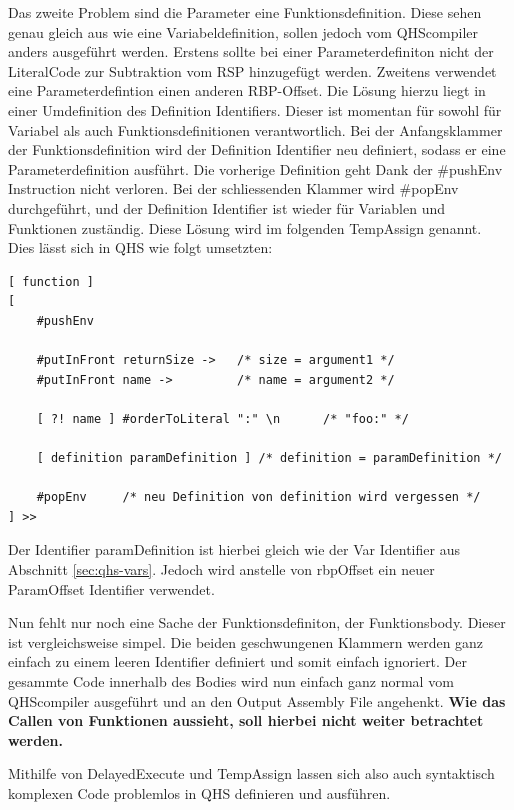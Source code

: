 Das zweite Problem sind die Parameter eine Funktionsdefinition. Diese sehen genau gleich aus wie eine Variabeldefinition, sollen jedoch vom QHScompiler anders ausgeführt werden.
Erstens sollte bei einer Parameterdefiniton nicht der LiteralCode zur Subtraktion vom RSP hinzugefügt werden. Zweitens verwendet eine Parameterdefintion einen anderen RBP-Offset.
Die Lösung hierzu liegt in einer Umdefinition des Definition Identifiers. Dieser ist momentan für sowohl für Variabel als auch Funktionsdefinitionen verantwortlich.
Bei der Anfangsklammer der Funktionsdefinition wird der Definition Identifier neu definiert, sodass er eine Parameterdefinition ausführt. Die vorherige Definition geht Dank der \#pushEnv Instruction nicht verloren.
Bei der schliessenden Klammer wird \#popEnv durchgeführt, und der Definition Identifier ist wieder für Variablen und Funktionen zuständig. Diese Lösung wird im folgenden TempAssign genannt.
Dies lässt sich in QHS wie folgt umsetzten:

\begin{lstlisting}[language=QHS, caption=Implementation eines TempAssigns für Parameter Definitionen]
[ function ]
[
    #pushEnv

    #putInFront returnSize ->   /* size = argument1 */
    #putInFront name ->         /* name = argument2 */

    [ ?! name ] #orderToLiteral ":" \n      /* "foo:" */

    [ definition paramDefinition ] /* definition = paramDefinition */

    #popEnv     /* neu Definition von definition wird vergessen */
] >>
\end{lstlisting}

Der Identifier paramDefinition ist hierbei gleich wie der Var Identifier aus Abschnitt \ref{sec:qhs-vars}. Jedoch wird anstelle von rbpOffset ein neuer ParamOffset Identifier verwendet.

Nun fehlt nur noch eine Sache der Funktionsdefiniton, der Funktionsbody. Dieser ist vergleichsweise simpel. Die beiden geschwungenen Klammern werden ganz einfach zu einem leeren Identifier definiert und somit einfach ignoriert.
Der gesammte Code innerhalb des Bodies wird nun einfach ganz normal vom QHScompiler ausgeführt und an den Output Assembly File angehenkt. \textbf{Wie das Callen von Funktionen aussieht, soll hierbei nicht weiter betrachtet werden.}

Mithilfe von DelayedExecute und TempAssign lassen sich also auch syntaktisch komplexen Code problemlos in QHS definieren und ausführen.






